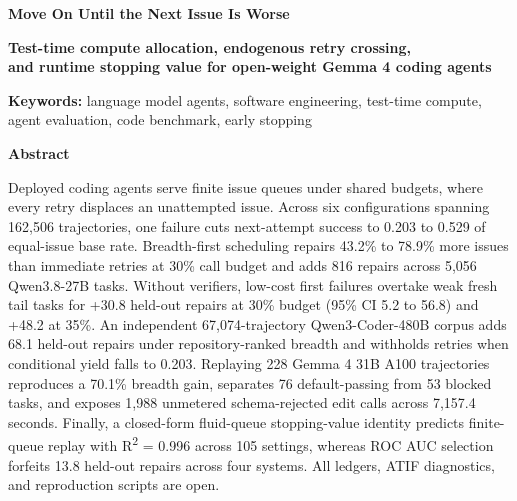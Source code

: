 \documentclass[10pt,a4paper]{article}
\begin{document}
\small


\begin{center}

{\LARGE\bfseries Move On Until the Next Issue Is Worse\par}

\vspace{5pt}

{\normalsize \textbf{Test-time compute allocation, endogenous retry crossing,\\ and runtime stopping value for open-weight Gemma 4 coding agents}\par}

\vspace{5pt}

{\small \textbf{Keywords:} language model agents, software engineering, test-time compute, agent evaluation, code benchmark, early stopping\par}

\end{center}

\vspace{2pt}

\begin{center}\textbf{Abstract}\end{center}

\begingroup\small

Deployed coding agents serve finite issue queues under shared budgets, where every retry displaces an unattempted issue. Across six configurations spanning 162,506 trajectories, one failure cuts next-attempt success to 0.203 to 0.529 of equal-issue base rate. Breadth-first scheduling repairs 43.2\% to 78.9\% more issues than immediate retries at 30\% call budget and adds 816 repairs across 5,056 Qwen3.8-27B tasks. Without verifiers, low-cost first failures overtake weak fresh tail tasks for +30.8 held-out repairs at 30\% budget (95\% CI 5.2 to 56.8) and +48.2 at 35\%. An independent 67,074-trajectory Qwen3-Coder-480B corpus adds 68.1 held-out repairs under repository-ranked breadth and withholds retries when conditional yield falls to 0.203. Replaying 228 Gemma 4 31B A100 trajectories reproduces a 70.1\% breadth gain, separates 76 default-passing from 53 blocked tasks, and exposes 1,988 unmetered schema-rejected edit calls across 7,157.4 seconds. Finally, a closed-form fluid-queue stopping-value identity predicts finite-queue replay with R\textsuperscript{2} = 0.996 across 105 settings, whereas ROC AUC selection forfeits 13.8 held-out repairs across four systems. All ledgers, ATIF diagnostics, and reproduction scripts are open.
\end{document}
